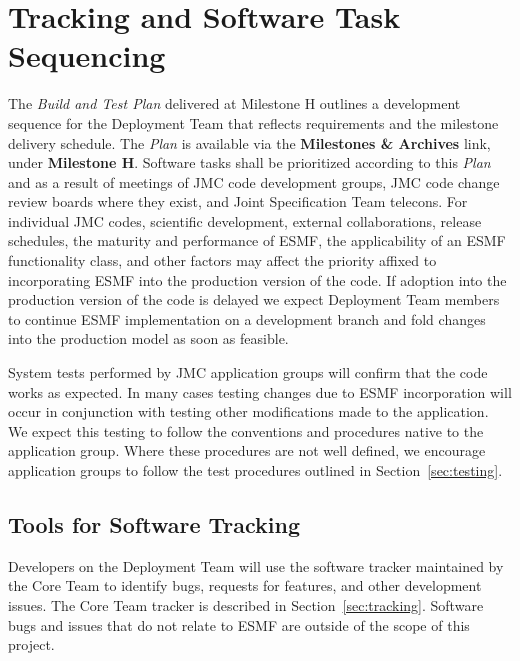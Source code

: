 
\section{Tracking and Software Task Sequencing}

The {\it Build and Test Plan} delivered at Milestone H outlines 
a development sequence for the Deployment Team that reflects requirements 
and the milestone delivery schedule.  The {\it Plan} is available via
the {\bf Milestones \& Archives} link, under {\bf Milestone H}.  
Software tasks shall be prioritized according to this 
{\it Plan} and as a result of meetings of JMC code development groups, JMC
code change review boards where they exist, and Joint Specification Team 
telecons.  For individual JMC codes, scientific 
development, external collaborations, release schedules, the maturity
and performance of ESMF, the applicability of an ESMF functionality class, 
and other factors may affect the priority affixed to incorporating ESMF into
the production version of the code.  If adoption into the production 
version of the code is delayed we expect Deployment Team members to 
continue ESMF implementation on a development branch and fold changes 
into the production model as soon as feasible.

System tests performed by JMC application groups will confirm that
the code works as expected.  In many cases testing changes due to
ESMF incorporation will occur in conjunction with testing other modifications
made to the application.  We expect this testing to follow the conventions
and procedures native to the application group.  Where these procedures 
are not well defined, we encourage application groups to follow the test 
procedures outlined in Section~\ref{sec:testing}.

\subsection{Tools for Software Tracking}

Developers on the Deployment Team will use the software tracker 
maintained by the Core Team to identify bugs, requests for features, 
and other development issues.  The Core Team tracker is described 
in Section~\ref{sec:tracking}.  Software bugs and issues that do not relate 
to ESMF are outside of the scope of this project.




















